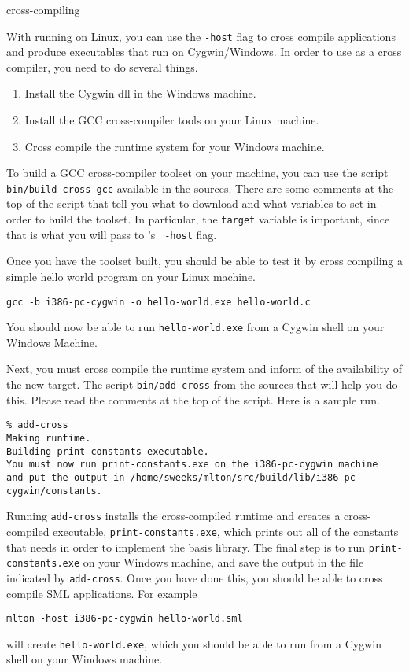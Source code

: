        {cross-compiling}

With {\mlton} running on Linux, you can use the {\tt -host} flag to cross
compile applications and produce executables that run on Cygwin/Windows.
In order to use {\mlton} as a
cross compiler, you need to do several things.

\begin{enumerate}

\item Install the Cygwin dll in the Windows machine.

\item Install the GCC cross-compiler tools on your Linux machine.

\item Cross compile the {\mlton} runtime system for your Windows machine.

\end{enumerate}

To build a GCC cross-compiler toolset on your machine, you can use the script
{\tt bin/build-cross-gcc} available in the {\mlton} sources.  There are some
comments at the top of the script that tell you what to download and what
variables to set in order to build the toolset.  In particular, the {\tt target}
variable is important, since that is what you will pass to {\mlton}'s {\tt
-host} flag.

Once you have the toolset built, you should be able to test it by cross
compiling a simple hello world program on your Linux machine.
\begin{verbatim}
gcc -b i386-pc-cygwin -o hello-world.exe hello-world.c
\end{verbatim}
You should now be able to run {\tt hello-world.exe} from a Cygwin shell on your
Windows Machine.

Next, you must cross compile the {\mlton} runtime system and inform {\mlton} of
the availability of the new target.  The script {\tt bin/add-cross} from
the {\mlton} sources that will help you do this.  Please read the comments at
the top of the script.  Here is a sample run.
\begin{verbatim}
% add-cross
Making runtime.
Building print-constants executable.
You must now run print-constants.exe on the i386-pc-cygwin machine
and put the output in /home/sweeks/mlton/src/build/lib/i386-pc-cygwin/constants.
\end{verbatim}
Running {\tt add-cross} installs the cross-compiled runtime and creates a
cross-compiled executable, {\tt print-constants.exe}, which prints out all of
the constants that {\mlton} needs in order to implement the basis library.  The
final step is to run {\tt print-constants.exe} on your Windows machine, and save
the output in the file indicated by {\tt add-cross}.  Once you have done this,
you should be able to cross compile SML applications.  For example
\begin{verbatim}
mlton -host i386-pc-cygwin hello-world.sml
\end{verbatim}
will create {\tt hello-world.exe}, which you should be able to run from a Cygwin
shell on your Windows machine.
